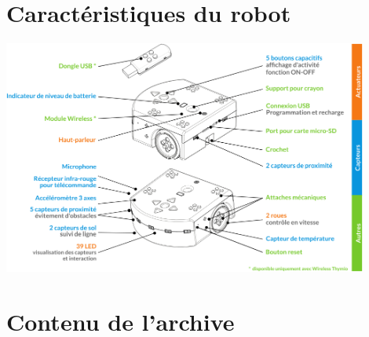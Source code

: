 \documentclass[a4paper, 12pt]{report}
\begin{document}
\chapter*{Caractéristiques du robot}
\includegraphics[width=0.9\textwidth]{Thymio_details.png}
\chapter*{Contenu de l'archive}
\end{document}
